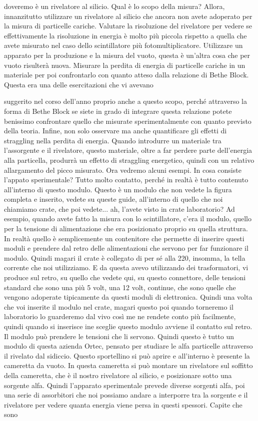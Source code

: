 doveremo è un rivelatore al silicio. Qual è lo scopo della misura? Allora, innanzitutto utilizzare un rivelatore al silicio che ancora non avete adoperato per la misura di particelle cariche. Valutare la risoluzione del rivelatore per vedere se effettivamente la risoluzione in energia è molto più piccola rispetto a quella che avete misurato nel caso dello scintillatore più fotomultiplicatore. Utilizzare un apparato per la produzione e la misura del vuoto, questa è un'altra cosa che per vuoto risulterà nuova. Misurare la perdita di energia di particelle cariche in un materiale per poi confrontarlo con quanto atteso dalla relazione di Bethe Block. Questa era una delle esercitazioni che vi avevano 

suggerito nel corso dell'anno proprio anche a questo scopo, perché attraverso la forma di Bethe Block se siete in grado di integrare questa relazione potete benissimo confrontare quello che misurate sperimentalmente con quanto previsto della teoria. Infine, non solo osservare ma anche quantificare gli effetti di straggling nella perdita di energia. Quando introdurre un materiale tra l'assorgente e il rivelatore, questo materiale, oltre a far perdere parte dell'energia alla particella, produrrà un effetto di straggling energetico, quindi con un relativo allargamento del picco misurato. Ora vedremo alcuni esempi. In cosa consiste l'appato sperimentale? Tutto molto contatto, perché in realtà è tutto contenuto all'interno di questo modulo. Questo è un modulo che non vedete la figura completa e inserito, vedete su queste guide, all'interno di quello che noi chiamiamo crate, che poi vedete... ah, l'avete visto in crate laboratorio? Ad esempio, quando avete fatto la misura con lo scintillatore, c'era il modulo, quello per la tensione di alimentazione che era posizionato proprio su quella struttura. In realtà quello è semplicemente un contenitore che permette di inserire questi moduli e prendere dal retro delle alimentazioni che servono per far funzionare il modulo. Quindi magari il crate è collegato di per sé alla 220, insomma, la tella corrente che noi utilizziamo. E da questa avevo utilizzando dei trasformatori, vi produce sul retro, su quello che vedete qui, su questo connettore, delle tensioni standard che sono una più 5 volt, una 12 volt, continue, che sono quelle che vengono adoperate tipicamente da questi moduli di elettronica. Quindi una volta che voi inserite il modulo nel crate, magari questo poi quando torneremo il laboratorio lo guarderemo dal vivo così me ne rendete conto più facilmente, quindi quando si inserisce ine sceglie questo modulo avviene il contatto sul retro. Il modulo può prendere le tensioni che li servono. Quindi questo è tutto un modulo di questa azienda Ortec, pensato per studiare le alfa particelle attraverso il rivelato dal sidiccio. Questo sportellino si può aprire e all'interno è presente la cameretta da vuoto. In questa cameretta si può montare un rivelatore sul soffitto della cameretta, che è il nostro rivelatore al silicio, e posizionare sotto una sorgente alfa. Quindi l'apparato sperimentale prevede diverse sorgenti alfa, poi una serie di assorbitori che noi possiamo andare a interporre tra la sorgente e il rivelatore per vedere quanta energia viene persa in questi spessori. Capite che sono 